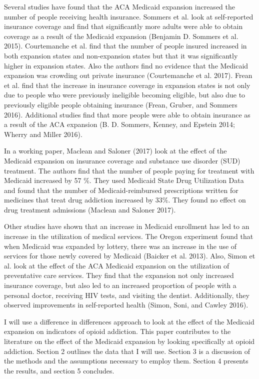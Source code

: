 \documentclass{article}
\begin{document}
Several studies have found that the ACA Medicaid expansion increased the number of people receiving health insurance.  Sommers et al. look at self-reported insurance coverage and find that significantly more adults were able to obtain coverage as a result of the Medicaid expansion (Benjamin D. Sommers et al. 2015).  Courtemanche et al. find that the number of people insured increased in both expansion states and non-expansion states but that it was significantly higher in expansion states.  Also the authors find no evidence that the Medicaid expansion was crowding out private insurance (Courtemanche et al. 2017).  Frean et al. find that the increase in insurance coverage in expansion states is not only due to people who were previously ineligible becoming eligible, but also due to previously eligible people obtaining insurance (Frean, Gruber, and Sommers 2016).  Additional studies find that more people were able to obtain insurance as a result of the ACA expansion (B. D. Sommers, Kenney, and Epstein 2014; Wherry and Miller 2016).  

In a working paper, Maclean and Saloner (2017) look at the effect of the Medicaid expansion on insurance coverage and substance use disorder (SUD) treatment.  The authors find that the number of people paying for treatment with Medicaid increased by 57 $\%$. They used Medicaid State Drug Utilization Data and found that the number of Medicaid-reimbursed prescriptions written for medicines that treat drug addiction increased by 33$\%$.  They found no effect on drug treatment admissions (Maclean and Saloner 2017). 

Other studies have shown that an increase in Medicaid enrollment has led to an increase in the utilization of medical services.  The Oregon experiment found that when Medicaid was expanded by lottery, there was an increase in the use of services for those newly covered by Medicaid (Baicker et al. 2013).  Also, Simon et al. look at the effect of the ACA Medicaid expansion on the utilization of preventative care services.  They find that the expansion not only increased insurance coverage, but also led to an increased proportion of people with a personal doctor, receiving HIV tests, and visiting the dentist.  Additionally, they observed improvements in self-reported health (Simon, Soni, and Cawley 2016).  

I will use a difference in differences approach to look at the effect of the Medicaid expansion on indicators of opioid addiction.  This paper contributes to the literature on the effect of the Medicaid expansion by looking specifically at opioid addiction.  Section 2 outlines the data that I will use.  Section 3 is a discussion of the methods and the assumptions necessary to employ them.  Section 4 presents the results, and section 5 concludes.   
\end{document}
